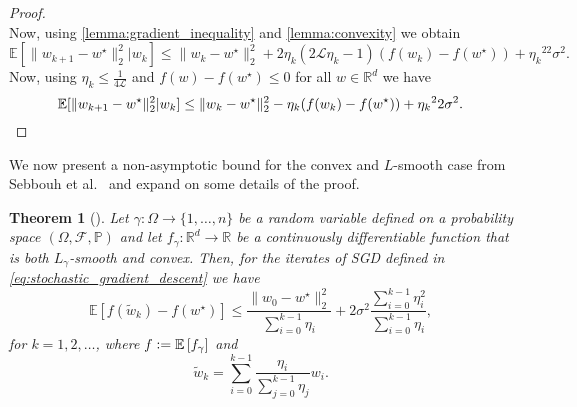 \documentclass[12pt]{article}
\newtheorem{theorem}{Theorem}[section]
\theoremstyle{definition}
\numberwithin{equation}{section}
\newcommand{\R}{\mathbb{R}}
\newcommand{\E}{\mathbb{E}}
\newcommand{\BP}{\mathbb{P}}
\newcommand{\CF}{\mathcal{F}}
\newcommand{\CL}{\mathcal{L}}
\newcommand{\ev}[1]{\mathbb{E}\left[{#1}\right]}
\newcommand{\norm}[1]{\lVert{#1}\rVert_2}
\newcommand{\defeq}{\vcentcolon=}
\begin{document}
\begin{proof}
\begin{equation*}
  \end{equation*}
  Now, using \autoref{lemma:gradient_inequality} and \autoref{lemma:convexity} we obtain
  \begin{equation*}
    \E[\norm{w_{k+1} - w^\star}^2|w_k] \leq \norm{w_{k} - w^\star}^2 + 2 \eta_k(2\CL \eta_k - 1)(f(w_{k}) - f(w^\star))+ {\eta_k}^22\sigma^2.
  \end{equation*}
  Now, using $\eta_k \leq \frac{1}{4 \CL}$ and $f(w) - f(w^\star) \leq 0$ for all $w \in \R^d$ we have
  \begin{equation*}
    \E[\norm{w_{k+1} - w^\star}^2|w_k] \leq \norm{w_{k} - w^\star}^2 - \eta_k(f(w_{k}) - f(w^\star))+ {\eta_k}^22\sigma^2. \qedhere
  \end{equation*}
\end{proof}
We now present a non-asymptotic bound for the convex and $L$-smooth case from Sebbouh et al.\ \cite{sebbouhAlmostSureConvergence2021} and expand on some details of the proof.
\begin{theorem}[]
  \label{thm:SGD_bound}
  Let $\gamma : \Omega \rightarrow \{1,\dots,n\}$ be a random variable defined on a probability space $(\Omega, \CF, \BP)$ and let $f_{\gamma} : \R^d \rightarrow \R$ be a continuously differentiable function that is both $L_{\gamma}$-smooth and convex. Then, for the iterates of SGD defined in \eqref{eq:stochastic_gradient_descent} we have
  \begin{equation*}
    \ev{f(\widetilde{w}_k) - f(w^\star)} \leq \frac{\norm{w_{0} - w^\star}^2}{\sum_{i=0}^{k-1}\eta_i} + 2 \sigma^2 \frac{\sum_{i=0}^{k-1}\eta_i^2}{\sum_{i=0}^{k-1}\eta_i},
  \end{equation*}
  for $k = 1, 2, \dots$, where $f \defeq \ev{f_\gamma}$ and
  \begin{equation*}
    \widetilde{w}_k = \sum_{i=0}^{k-1}\frac{\eta_i}{\sum_{j=0}^{k-1}\eta_j}w_i.
  \end{equation*}
\end{theorem}
\end{document}
